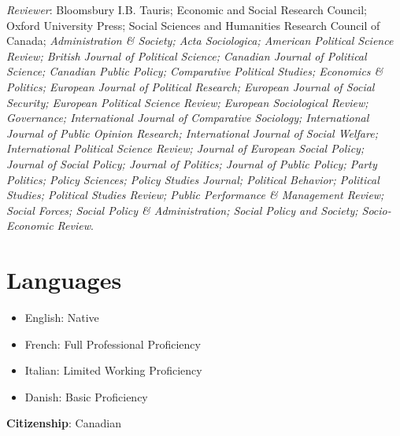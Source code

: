 \documentclass[letterpaper,fontsize=10.5pt]{scrartcl}
\begin{document}
\hfill \break
{}
{}\textit{Reviewer}: Bloomsbury I.B. Tauris; Economic and Social Research Council; Oxford University Press; Social Sciences and Humanities Research Council of Canada; \textit{Administration \& Society; Acta Sociologica; American Political Science Review; British Journal of Political Science; Canadian Journal of Political Science; Canadian Public Policy; Comparative Political Studies; Economics \& Politics; European Journal of Political Research; European Journal of Social Security; European Political Science Review; European Sociological Review; Governance; International Journal of Comparative Sociology; International Journal of Public Opinion Research; International Journal of Social Welfare; International Political Science Review; Journal of European Social Policy; Journal of Social Policy; Journal of Politics; Journal of Public Policy; Party Politics; Policy Sciences; Policy Studies Journal; Political Behavior; Political Studies; Political Studies Review; Public Performance \& Management Review; Social Forces; Social Policy \& Administration; Social Policy and Society; Socio-Economic Review}.

\section{Languages}
\begin{itemize}[itemsep=0em, topsep=0em, partopsep=0em]
	\item English: Native
	\item French: Full Professional Proficiency
	\item Italian: Limited Working Proficiency
	\item Danish: Basic Proficiency\\
\end{itemize}

{}\textbf{Citizenship}: Canadian

\end{document}
